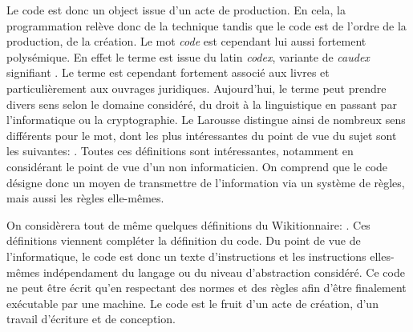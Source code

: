 \documentclass[12pt]{article} %
\begin{document}
Le code est donc un object issue d'un acte de production. En cela, la programmation relève donc de la technique tandis que le code est de l'ordre de la production, de la création. Le mot \textit{code} est cependant lui aussi fortement polysémique. En effet le terme est issue du latin \textit{codex}, variante de \textit{caudex} signifiant . Le terme est cependant fortement associé aux livres et particulièrement aux ouvrages juridiques. Aujourd'hui, le terme peut prendre divers sens selon le domaine considéré, du droit à la linguistique en passant par l'informatique ou la cryptographie. Le Larousse distingue ainsi de nombreux sens différents pour le mot, dont les plus intéressantes du point de vue du sujet sont les suivantes:
\cite{Nimmo2017-ya}. Toutes ces définitions sont intéressantes, notamment en considérant le point de vue d'un non informaticien. On comprend que le code désigne donc un moyen de transmettre de l'information via un système de règles, mais aussi les règles elle-mêmes. 

On considèrera tout de même quelques définitions du Wikitionnaire:
\cite{noauthor_undated-vw}. Ces définitions viennent compléter la définition du code. Du point de vue de l'informatique, le code est donc un texte d'instructions et les instructions elles-mêmes indépendament du langage ou du niveau d'abstraction considéré. Ce code ne peut être écrit qu'en respectant des normes et des règles afin d'être finalement exécutable par une machine. Le code est le fruit d'un acte de création, d'un travail d'écriture et de conception.
\end{document}
